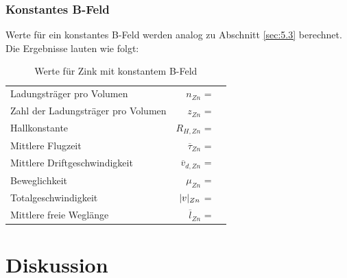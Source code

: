 \subsubsection{Konstantes B-Feld} \label{sec:5.5.2}

\justifying Werte für ein konstantes B-Feld werden analog zu Abschnitt \ref{sec:5.3} berechnet. Die Ergebnisse lauten wie folgt:

\begin{table}[H]
\centering
    \begin{tabular}{l r l}
    \toprule
        Ladungsträger pro Volumen               &$n_{Zn}$               = & \text{}  \\
        Zahl der Ladungsträger pro Volumen      &$z_{Zn}$               = & \text{}  \\
        Hallkonstante                           &$R_{H,Zn}$             = & \text{} \\
        Mittlere Flugzeit                       &$\overline{\tau}_{Zn}$ = & \text{}\\
        Mittlere Driftgeschwindigkeit           &$\overline{v}_{d,Zn}$  = & \text{}\\
        Beweglichkeit                           &$\mu_{Zn}$             = & \text{} \\
        Totalgeschwindigkeit                    &$\lvert v\rvert_{Zn}$         = & \text{}  \\
        Mittlere freie Weglänge                 &$\overline{l}_{Zn}$    = & \text{}  \\
        \bottomrule
    \end{tabular}
\caption{Werte für Zink mit konstantem B-Feld}
\label{tab:10}
\end{table}


\section{Diskussion}



\newpage
\printbibliography

